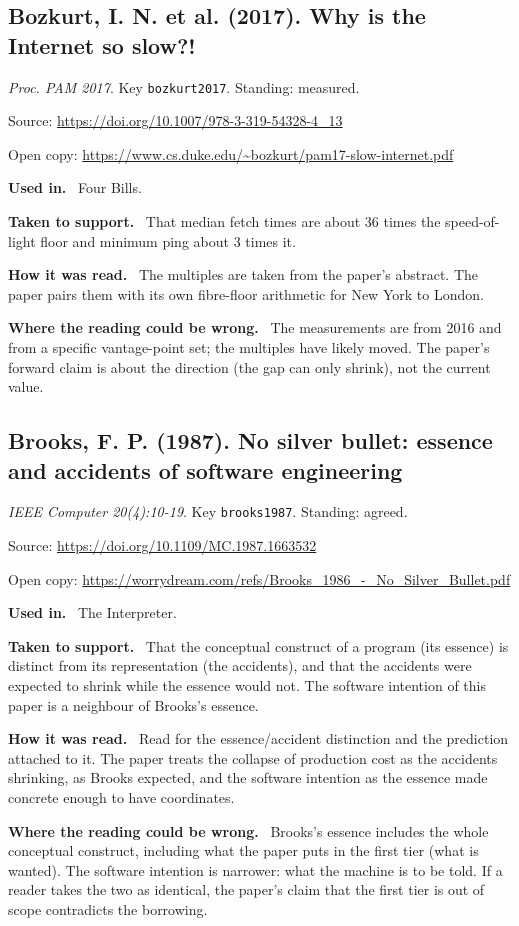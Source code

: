 \documentclass[11pt,oneside]{article}
\newcommand{\field}[1]{\par\noindent\textbf{\color{accent}#1.}\ }
\begin{document}
\subsection*{Bozkurt, I. N. et al. (2017). Why is the Internet so slow?!}
\noindent\small\emph{Proc. PAM 2017}. Key \texttt{bozkurt2017}. Standing: measured.
\par\noindent\small Source: \url{https://doi.org/10.1007/978-3-319-54328-4_13}
\par\noindent\small Open copy: \url{https://www.cs.duke.edu/~bozkurt/pam17-slow-internet.pdf}
\normalsize
\field{Used in} Four Bills.
\field{Taken to support} That median fetch times are about 36 times the speed-of-light floor and minimum ping about 3 times it.
\field{How it was read} The multiples are taken from the paper's abstract. The paper pairs them with its own fibre-floor arithmetic for New York to London.
\field{Where the reading could be wrong} The measurements are from 2016 and from a specific vantage-point set; the multiples have likely moved. The paper's forward claim is about the direction (the gap can only shrink), not the current value.

\hypertarget{src:brooks1987}{}
\subsection*{Brooks, F. P. (1987). No silver bullet: essence and accidents of software engineering}
\noindent\small\emph{IEEE Computer 20(4):10-19}. Key \texttt{brooks1987}. Standing: agreed.
\par\noindent\small Source: \url{https://doi.org/10.1109/MC.1987.1663532}
\par\noindent\small Open copy: \url{https://worrydream.com/refs/Brooks_1986_-_No_Silver_Bullet.pdf}
\normalsize
\field{Used in} The Interpreter.
\field{Taken to support} That the conceptual construct of a program (its essence) is distinct from its representation (the accidents), and that the accidents were expected to shrink while the essence would not. The software intention of this paper is a neighbour of Brooks's essence.
\field{How it was read} Read for the essence/accident distinction and the prediction attached to it. The paper treats the collapse of production cost as the accidents shrinking, as Brooks expected, and the software intention as the essence made concrete enough to have coordinates.
\field{Where the reading could be wrong} Brooks's essence includes the whole conceptual construct, including what the paper puts in the first tier (what is wanted). The software intention is narrower: what the machine is to be told. If a reader takes the two as identical, the paper's claim that the first tier is out of scope contradicts the borrowing.
\end{document}
